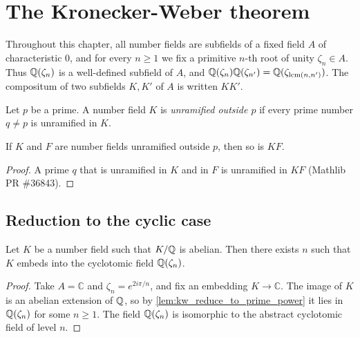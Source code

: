 \chapter{The Kronecker-Weber theorem}

Throughout this chapter, all number fields are subfields of a fixed field $A$ of characteristic
$0$, and for every $n \geq 1$ we fix a primitive $n$-th root of unity $\zeta_n \in A$. Thus
$\mathbb{Q}(\zeta_n)$ is a well-defined subfield of $A$, and $\mathbb{Q}(\zeta_n)\mathbb{Q}(\zeta_{n'}) =
\mathbb{Q}(\zeta_{\operatorname{lcm}(n,n')})$. The compositum of two subfields $K, K'$ of $A$ is written
$KK'$.

\begin{definition}
  \label{def:unramified_outside}
  \leanok
  Let $p$ be a prime. A number field $K$ is \emph{unramified outside $p$} if every prime number
  $q \neq p$ is unramified in $K$.
\end{definition}

\begin{lemma}
  \label{lem:unramified_outside_sup}
  \leanok
  If $K$ and $F$ are number fields unramified outside $p$, then so is $KF$.
\end{lemma}

\begin{proof}
  \leanok
  A prime $q$ that is unramified in $K$ and in $F$ is unramified in $KF$ (Mathlib PR \#36843).
\end{proof}

\section{Reduction to the cyclic case}

\begin{theorem}
  \label{thm:kronecker_weber}
  \leanok
  Let $K$ be a number field such that $K/\mathbb{Q}$ is abelian. Then there exists $n$ such that $K$
  embeds into the cyclotomic field $\mathbb{Q}(\zeta_n)$.
\end{theorem}

\begin{proof}
  \leanok
  Take $A = \mathbb{C}$ and $\zeta_n = e^{2i\pi/n}$, and fix an embedding $K \to \mathbb{C}$.
  The image of $K$ is an abelian extension of $\mathbb{Q}$, so by \ref{lem:kw_reduce_to_prime_power} it
  lies in $\mathbb{Q}(\zeta_n)$ for some $n \geq 1$. The field $\mathbb{Q}(\zeta_n)$ is isomorphic to the
  abstract cyclotomic field of level $n$.
\end{proof}

